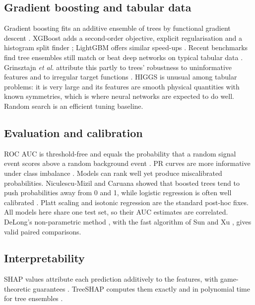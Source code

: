 \documentclass[conference]{IEEEtran}
\begin{document}
\subsection{Gradient boosting and tabular data}
Gradient boosting fits an additive ensemble of trees by functional gradient descent
\cite{friedman2001greedy}. XGBoost adds a second-order objective, explicit regularisation and a
histogram split finder \cite{chen2016xgboost}; LightGBM offers similar speed-ups \cite{ke2017lightgbm}.
Recent benchmarks find tree ensembles still match or beat deep networks on typical tabular data
\cite{grinsztajn2022tree,shwartzziv2022tabular}. Grinsztajn \emph{et al.} attribute this partly to
trees' robustness to uninformative features and to irregular target functions
\cite{grinsztajn2022tree}. HIGGS is unusual among tabular problems: it is very large and its
features are smooth physical quantities with known symmetries, which is where neural networks are
expected to do well. Random search \cite{bergstra2012random} is an efficient tuning baseline.

\subsection{Evaluation and calibration}
ROC AUC is threshold-free and equals the probability that a random signal event scores above a
random background event \cite{fawcett2006roc}. PR curves are more informative under class imbalance
\cite{saito2015precision}. Models can rank well yet produce miscalibrated probabilities.
Niculescu-Mizil and Caruana showed that boosted trees tend to push probabilities away from 0 and 1,
while logistic regression is often well calibrated \cite{niculescu2005predicting}. Platt scaling
\cite{platt1999probabilistic} and isotonic regression \cite{zadrozny2002transforming} are the
standard post-hoc fixes. All models here share one test set, so their AUC estimates are correlated.
DeLong's non-parametric method \cite{delong1988comparing}, with the fast algorithm of Sun and Xu
\cite{sun2014fast}, gives valid paired comparisons.

\subsection{Interpretability}
SHAP values attribute each prediction additively to the features, with game-theoretic guarantees
\cite{lundberg2017unified}. TreeSHAP computes them exactly and in polynomial time for tree ensembles
\cite{lundberg2020local}.
\end{document}
